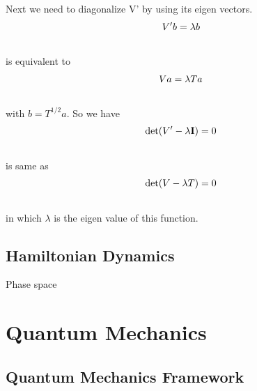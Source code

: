 \documentclass[letterpaper,10pt,english]{sphinxmanual}
\begin{document}
Next we need to diagonalize V' by using its eigen vectors.
\begin{gather}
\begin{split}V' b = \lambda b\end{split}\notag\\\begin{split}\end{split}\notag
\end{gather}
is equivalent to
\begin{gather}
\begin{split}V a = \lambda T a\end{split}\notag\\\begin{split}\end{split}\notag
\end{gather}
with $b = T^{1/2} a$. So we have
\begin{gather}
\begin{split}\det(V' - \lambda \mathbf I) = 0\end{split}\notag\\\begin{split}\end{split}\notag
\end{gather}
is same as
\begin{gather}
\begin{split}\det(V - \lambda T) = 0\end{split}\notag\\\begin{split}\end{split}\notag
\end{gather}
in which $\lambda$ is the eigen value of this function.


\subsection{Hamiltonian Dynamics}
\label{ClassicalMechanics:hamiltonian-dynamics}
Phase space


\section{Quantum Mechanics}
\label{QuantumMechanics:quantum-mechanics}\label{QuantumMechanics::doc}

\subsection{Quantum Mechanics Framework}
\label{QuantumMechanics:quantum-mechanics-framework}
\end{document}
